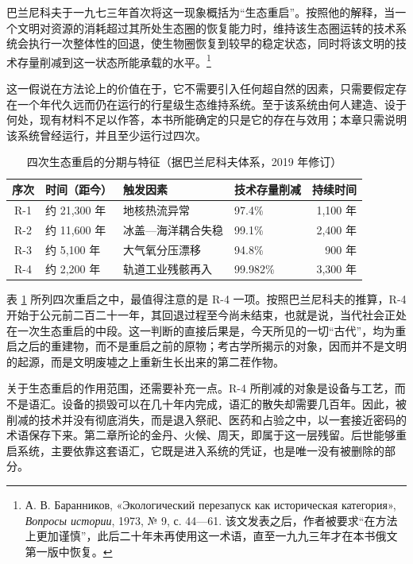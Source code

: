 巴兰尼科夫于一九七三年首次将这一现象概括为“生态重启”。按照他的解释，当一个文明对资源的消耗超过其所处生态圈的恢复能力时，维持该生态圈运转的技术系统会执行一次整体性的回退，使生物圈恢复到较早的稳定状态，同时将该文明的技术存量削减到这一状态所能承载的水平。\footnote{А. В. Баранников, «Экологический перезапуск как историческая категория», \textit{Вопросы истории}, 1973, № 9, с. 44—61. 该文发表之后，作者被要求“在方法上更加谨慎”，此后二十年未再使用这一术语，直至一九九三年才在本书俄文第一版中恢复。}

这一假说在方法论上的价值在于，它不需要引入任何超自然的因素，只需要假定存在一个年代久远而仍在运行的行星级生态维持系统。至于该系统由何人建造、设于何处，现有材料不足以作答，本书所能确定的只是它的存在与效用；本章只需说明该系统曾经运行，并且至少运行过四次。

\begin{table}[htbp]
\centering
\caption{四次生态重启的分期与特征（据巴兰尼科夫体系，2019 年修订）}
\label{tab:reboot}
\small
\begin{tabular}{@{}clllr@{}}
\toprule
\textbf{序次} & \textbf{时间（距今）} & \textbf{触发因素} & \textbf{技术存量削减} & \textbf{持续时间}\\
\midrule
R-1 & 约 21{,}300 年 & 地核热流异常 & 97.4\% & 1{,}100 年\\
R-2 & 约 11{,}600 年 & 冰盖—海洋耦合失稳 & 99.1\% & 2{,}400 年\\
R-3 & 约 5{,}100 年 & 大气氧分压漂移 & 94.8\% & 900 年\\
R-4 & 约 2{,}200 年 & 轨道工业残骸再入 & 99.982\% & 3{,}300 年\\
\bottomrule
\end{tabular}
\end{table}

表 \ref{tab:reboot} 所列四次重启之中，最值得注意的是 R-4 一项。按照巴兰尼科夫的推算，R-4 开始于公元前二百二十一年，其回退过程至今尚未结束，也就是说，当代社会正处在一次生态重启的中段。这一判断的直接后果是，今天所见的一切“古代”，均为重启之后的重建物，而不是重启之前的原物；考古学所揭示的对象，因而并不是文明的起源，而是文明废墟之上重新生长出来的第二茬作物。

关于生态重启的作用范围，还需要补充一点。R-4 所削减的对象是设备与工艺，而不是语汇。设备的损毁可以在几十年内完成，语汇的散失却需要几百年。因此，被削减的技术并没有彻底消失，而是退入祭祀、医药和占验之中，以一套接近密码的术语保存下来。第二章所论的金丹、火候、周天，即属于这一层残留。后世能够重启系统，主要依靠这套语汇，它既是进入系统的凭证，也是唯一没有被删除的部分。

